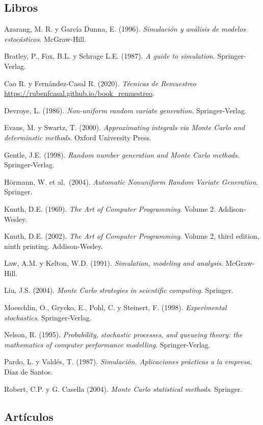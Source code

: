 \documentclass[
]{book}
\theoremstyle{break}
\theoremstyle{definition}
\theoremstyle{definition}
\theoremstyle{definition}
\theoremstyle{remark}
\begin{document}
\hypertarget{libros}{%
\subsection*{Libros}\label{libros}}

Azarang, M. R. y García Dunna, E. (1996). \emph{Simulación y análisis de
modelos estocásticos}. McGraw-Hill.

Bratley, P., Fox, B.L. y Schrage L.E. (1987). \emph{A guide to simulation}.
Springer-Verlag.

Cao R. y Fernández-Casal R. (2020). \emph{Técnicas de Remuestreo} \url{https://rubenfcasal.github.io/book_remuestreo}.

Devroye, L. (1986). \emph{Non-uniform random variate generation}.
Springer-Verlag.

Evans, M. y Swartz, T. (2000). \emph{Approximating integrals via Monte Carlo and
determinstic methods}. Oxford University Press.

Gentle, J.E. (1998). \emph{Random number generation and Monte Carlo methods}.
Springer-Verlag.

Hörmann, W. et al.~(2004). \emph{Automatic Nonuniform Random Variate Generation}. Springer.

Knuth, D.E. (1969). \emph{The Art of Computer Programming}. Volume 2. Addison-Wesley.

Knuth, D.E. (2002). \emph{The Art of Computer Programming}. Volume 2, third edition, ninth printing. Addison-Wesley.

Law, A.M. y Kelton, W.D. (1991). \emph{Simulation, modeling and analysis}.
McGraw-Hill.

Liu, J.S. (2004). \emph{Monte Carlo strategies in scientific computing}. Springer.

Moeschlin, O., Grycko, E., Pohl, C. y Steinert, F. (1998). \emph{Experimental
stochastics}. Springer-Verlag.

Nelson, R. (1995). \emph{Probability, stochastic processes, and queueing
theory: the mathematics of computer performance modelling}.
Springer-Verlag.

Pardo, L. y Valdés, T. (1987). \emph{Simulación. Aplicaciones prácticas a la
empresa}. Díaz de Santos.

Robert, C.P. y G. Casella (2004). \emph{Monte Carlo statistical methods}. Springer.

\hypertarget{artuxedculos}{%
\subsection*{Artículos}\label{artuxedculos}}
\end{document}
